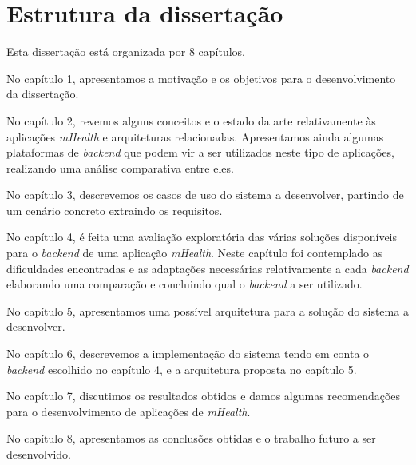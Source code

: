 \section{Estrutura da dissertação}
Esta dissertação está organizada por 8 capítulos.\par 
No capítulo 1, apresentamos a motivação e os objetivos para o desenvolvimento da dissertação.\par 
No capítulo 2, revemos alguns conceitos e o estado da arte relativamente às aplicações \textit{mHealth} e arquiteturas relacionadas. Apresentamos ainda algumas plataformas de \textit{backend} que podem vir a ser utilizados neste tipo de aplicações, realizando uma análise comparativa entre eles.\par 
No capítulo 3, descrevemos os casos de uso do sistema a desenvolver, partindo de um cenário concreto extraindo os requisitos.\par 
No capítulo 4, é feita uma avaliação exploratória das várias soluções disponíveis para o \textit{backend} de uma aplicação \textit{mHealth}. Neste capítulo foi contemplado as dificuldades encontradas e as adaptações necessárias relativamente a cada \textit{backend} elaborando uma comparação e concluindo qual o \textit{backend} a ser utilizado. \par
No capítulo 5, apresentamos uma possível arquitetura para a solução do sistema a desenvolver. \par 
No capítulo 6, descrevemos a implementação do sistema tendo em conta o \textit{backend} escolhido no capítulo 4, e a arquitetura proposta no capítulo 5. \par 
No capítulo 7, discutimos os resultados obtidos e damos algumas recomendações para o desenvolvimento de aplicações de \textit{mHealth}. \par 
No capítulo 8, apresentamos as conclusões obtidas e o trabalho futuro a ser desenvolvido.
\cleardoublepage